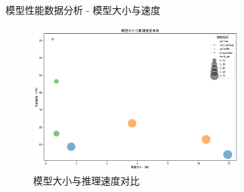 \documentclass{beamer}
\begin{document}
\begin{frame}{模型性能数据分析 - 模型大小与速度}
    \begin{figure}
        \centering
        \includegraphics[width=0.7\textwidth]{pic/size_fps.png}
        \caption{模型大小与推理速度对比}
    \end{figure}
\end{frame}
\end{document}
